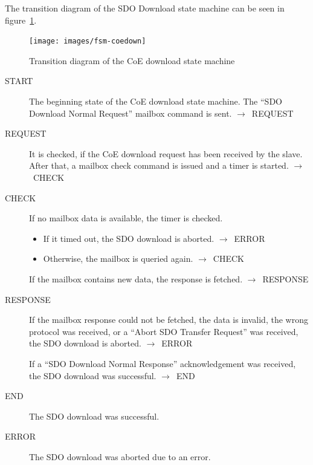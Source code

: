 \documentclass[a4paper,12pt,BCOR6mm,bibtotoc,idxtotoc]{scrbook}
\begin{document}
The transition diagram of the SDO Download state machine can be seen
in figure~\ref{fig:fsm-coedown}.

\begin{figure}[htbp]
  \centering
  \texttt{[image: images/fsm-coedown]} %
  \caption{Transition diagram of the CoE download state machine}
  \label{fig:fsm-coedown}
\end{figure}


\begin{description}
\item[START] The beginning state of the CoE download state
  machine. The ``SDO Download Normal Request'' mailbox command is
  sent. $\rightarrow$~REQUEST

\item[REQUEST] It is checked, if the CoE download request has been
  received by the slave. After that, a mailbox check command is issued
  and a timer is started. $\rightarrow$~CHECK

\item[CHECK] If no mailbox data is available, the timer is checked.
  \begin{itemize}
  \item If it timed out, the SDO download is aborted.
    $\rightarrow$~ERROR
  \item Otherwise, the mailbox is queried again.
    $\rightarrow$~CHECK
  \end{itemize}

  If the mailbox contains new data, the response is fetched.
  $\rightarrow$~RESPONSE

\item[RESPONSE] If the mailbox response could not be fetched, the data
  is invalid, the wrong protocol was received, or a ``Abort SDO
  Transfer Request'' was received, the SDO download is aborted.
  $\rightarrow$~ERROR

  If a ``SDO Download Normal Response'' acknowledgement was received,
  the SDO download was successful. $\rightarrow$~END

\item[END] The SDO download was successful.

\item[ERROR] The SDO download was aborted due to an error.

\end{description}

\end{document}
